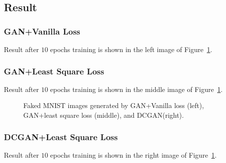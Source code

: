 \documentclass[runningheads]{llncs}
\begin{document}
\subsection{Result} 
\subsubsection{GAN+Vanilla Loss} Result after $10$ epochs training is shown in the left image of Figure~\ref{fig3}.
\subsubsection{GAN+Least Square Loss} Result after $10$ epochs training is shown in the middle image of Figure~\ref{fig3}.
\begin{figure}[ht]
	\centering
	\setlength{\fboxrule}{0.0pt}
	\caption{Faked MNIST images generated by GAN+Vanilla loss (left), GAN+least square loss (middle), and DCGAN(right).}
	\label{fig3}
\end{figure}
\subsubsection{DCGAN+Least Square Loss} Result after $10$ epochs training is shown in the right image of Figure~\ref{fig3}.
\end{document}
